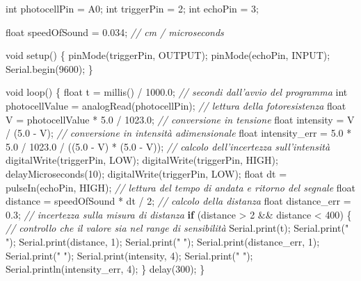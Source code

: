 \documentclass[11pt]{article}
\newenvironment{Shaded}{}{}
\newcommand{\DataTypeTok}[1]{\textcolor[rgb]{0.56,0.13,0.00}{{#1}}}
\newcommand{\DecValTok}[1]{\textcolor[rgb]{0.25,0.63,0.44}{{#1}}}
\newcommand{\FloatTok}[1]{\textcolor[rgb]{0.25,0.63,0.44}{{#1}}}
\newcommand{\StringTok}[1]{\textcolor[rgb]{0.25,0.44,0.63}{{#1}}}
\newcommand{\CommentTok}[1]{\textcolor[rgb]{0.38,0.63,0.69}{\textit{{#1}}}}
\newcommand{\NormalTok}[1]{{#1}}
\newcommand{\ControlFlowTok}[1]{\textcolor[rgb]{0.00,0.44,0.13}{\textbf{{#1}}}}
\begin{document}
\begin{Shaded}
\begin{Highlighting}[]
\DataTypeTok{int}\NormalTok{ photocellPin = A0;}
\DataTypeTok{int}\NormalTok{ triggerPin = }\DecValTok{2}\NormalTok{;}
\DataTypeTok{int}\NormalTok{ echoPin = }\DecValTok{3}\NormalTok{;}

\DataTypeTok{float}\NormalTok{ speedOfSound = }\FloatTok{0.034}\NormalTok{; }\CommentTok{// cm / microseconds}

\DataTypeTok{void}\NormalTok{ setup() \{}
\NormalTok{  pinMode(triggerPin, OUTPUT);}
\NormalTok{  pinMode(echoPin, INPUT);}
\NormalTok{  Serial.begin(}\DecValTok{9600}\NormalTok{);}
\NormalTok{\}}

\DataTypeTok{void}\NormalTok{ loop() \{}
  \DataTypeTok{float}\NormalTok{ t = millis() / }\FloatTok{1000.0}\NormalTok{; }\CommentTok{// secondi dall'avvio del programma}
  \DataTypeTok{int}\NormalTok{ photocellValue = analogRead(photocellPin); }\CommentTok{// lettura della fotoresistenza}
  \DataTypeTok{float}\NormalTok{ V = photocellValue * }\FloatTok{5.0}\NormalTok{ / }\FloatTok{1023.0}\NormalTok{; }\CommentTok{// conversione in tensione}
  \DataTypeTok{float}\NormalTok{ intensity = V / (}\FloatTok{5.0}\NormalTok{ - V); }\CommentTok{// conversione in intensità adimensionale}
  \DataTypeTok{float}\NormalTok{ intensity_err = }\FloatTok{5.0}\NormalTok{ * }\FloatTok{5.0}\NormalTok{ / }\FloatTok{1023.0}\NormalTok{ / ((}\FloatTok{5.0}\NormalTok{ - V) * (}\FloatTok{5.0}\NormalTok{ - V)); }\CommentTok{// calcolo dell'incertezza sull'intensità}
\NormalTok{  digitalWrite(triggerPin, LOW);}
\NormalTok{  digitalWrite(triggerPin, HIGH);}
\NormalTok{  delayMicroseconds(}\DecValTok{10}\NormalTok{);}
\NormalTok{  digitalWrite(triggerPin, LOW);}
  \DataTypeTok{float}\NormalTok{ dt = pulseIn(echoPin, HIGH); }\CommentTok{// lettura del tempo di andata e ritorno del segnale}
  \DataTypeTok{float}\NormalTok{ distance = speedOfSound * dt / }\DecValTok{2}\NormalTok{; }\CommentTok{// calcolo della distanza}
  \DataTypeTok{float}\NormalTok{ distance_err = }\FloatTok{0.3}\NormalTok{; }\CommentTok{// incertezza sulla misura di distanza}
  \ControlFlowTok{if}\NormalTok{ (distance > }\DecValTok{2}\NormalTok{ && distance < }\DecValTok{400}\NormalTok{) \{ }\CommentTok{// controllo che il valore sia nel range di sensibilità}
\NormalTok{    Serial.print(t);}
\NormalTok{    Serial.print(}\StringTok{" "}\NormalTok{);}
\NormalTok{    Serial.print(distance, }\DecValTok{1}\NormalTok{);}
\NormalTok{    Serial.print(}\StringTok{" "}\NormalTok{);}
\NormalTok{    Serial.print(distance_err, }\DecValTok{1}\NormalTok{);}
\NormalTok{    Serial.print(}\StringTok{" "}\NormalTok{);}
\NormalTok{    Serial.print(intensity, }\DecValTok{4}\NormalTok{);}
\NormalTok{    Serial.print(}\StringTok{" "}\NormalTok{);}
\NormalTok{    Serial.println(intensity_err, }\DecValTok{4}\NormalTok{);}
\NormalTok{  \}}
\NormalTok{  delay(}\DecValTok{300}\NormalTok{);}
\NormalTok{\}}
\end{Highlighting}
\end{Shaded}
\end{document}
